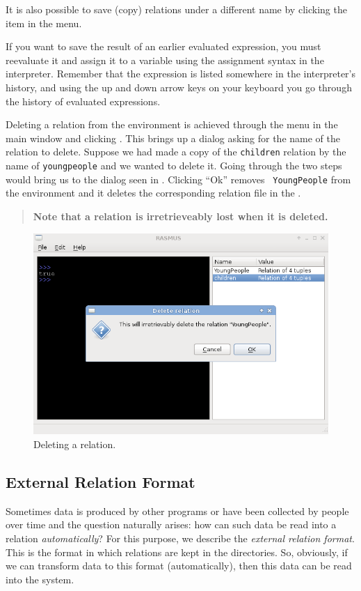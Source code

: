 \documentclass[a4,14pt,latin1]{article}
\begin{document}
It is also possible to save (copy) relations under a different name by
clicking the  item in the  menu.

If you want to save the result of an earlier evaluated expression, you
must reevaluate it and assign it to a variable using the \RAS{}
assignment syntax in the interpreter. Remember that the expression is
listed somewhere in the interpreter's history, and using the up and
down arrow keys on your keyboard you go through the history of
evaluated expressions.

Deleting a relation from the environment is achieved through the
 menu in the main window and clicking . This brings up a dialog asking for the name of the
relation to delete. Suppose we had made a copy of the {\tt children}
relation by the name of {\tt youngpeople} and we wanted to delete
it. Going through the two steps would bring us to the dialog seen in
. Clicking ``Ok'' removes {\tt
  YoungPeople} from the environment and it deletes the corresponding
relation file in the .

\begin{quote}
  \bf Note that a relation is irretrieveably lost when it is deleted.
\end{quote}

\begin{figure}[bp]
  \centerline{\includegraphics[scale=0.5]{delete_relation.png}}
  \caption{Deleting a relation.}
  \label{fig:delete_relation}
\end{figure}

\subsection{External Relation Format}
\label{exrelformat}
Sometimes data is produced by other programs or have been collected by
people over time and the question naturally arises: how can such data
be read into a relation {\em automatically}? For this purpose, we
describe the {\em external relation format}. This is the format in
which relations are kept in the directories. So, obviously, if we can
transform data to this format (automatically), then this data can be
read into the system.
\end{document}
